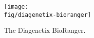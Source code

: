 \begin{figure}[h]
    \centering
    \texttt{[image: \\fig/diagenetix-bioranger]}
    \caption{The Diagenetix BioRanger.}
    \label{fig:diagenetix-bioranger}
\end{figure}